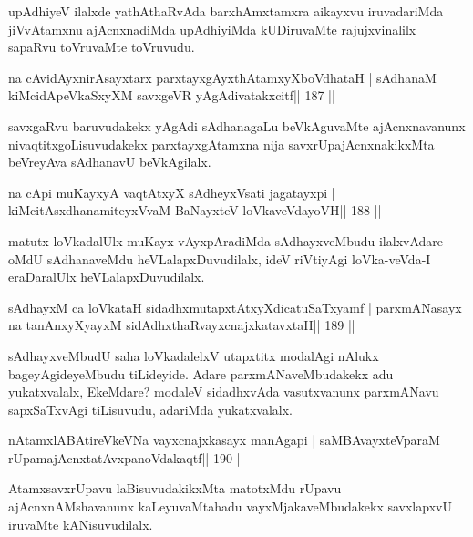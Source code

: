\begin{artha}
upAdhiyeV ilalxde yathAthaRvAda barxhAmxtamxra aikayxvu iruvadariMda jiVvAtamxnu ajAcnxnadiMda upAdhiyiMda kUDiruvaMte rajujxvinalilx sapaRvu toVruvaMte toVruvudu.
\end{artha}

\begin{shl}
na cAvidAyxnirAsayxtarx parxtayxgAyxthAtamxyXboVdhataH |
sAdhanaM kiMcidApeVkaSxyXM savxgeVR yAgAdivatakxcitf\hfill || 187 ||
\end{shl}

\begin{artha}
savxgaRvu baruvudakekx yAgAdi sAdhanagaLu beVkAguvaMte ajAcnxnavanunx nivaqtitxgoLisuvudakekx parxtayxgAtamxna nija savxrUpajAcnxnakikxMta beVreyAva sAdhanavU beVkAgilalx.
\end{artha}

\begin{shl}
na cApi muKayxyA vaqtAtxyX sAdheyxV\s sati jagatayxpi |
kiMcitAsxdhanamiteyxVvaM BaNayxteV loVkaveVdayoVH\hfill || 188 ||
\end{shl}

\begin{artha}
matutx loVkadalUlx muKayx vAyxpAradiMda sAdhayxveMbudu ilalxvAdare oMdU sAdhanaveMdu heVLalapxDuvudilalx, ideV riVtiyAgi loVka-veVda-I eraDaralUlx heVLalapxDuvudilalx.
\end{artha}

\begin{shl}
sAdhayxM ca loVkataH sidadhxmutapxtAtxyXdicatuSaTxyamf |
parxmANasayx na tanAnxyXyayxM sidAdhxthaRvayxcnajxkatavxtaH\hfill || 189 ||
\end{shl}

\begin{artha}
sAdhayxveMbudU saha loVkadalelxV utapxtitx modalAgi nAlukx bageyAgide\-yeMbudu tiLideyide. Adare parxmANaveMbudakekx adu yukatxvalalx, EkeMdare? modaleV sidadhxvAda vasutxvanunx parxmANavu sapxSaTxvAgi tiLisuvudu, adariMda yukatxvalalx.
\end{artha}


\begin{shl}
nA\s\s tamxlABAtireVkeVNa vayxcnajxkasayx manAgapi |
saMBAvayxteV\s paraM rUpamajAcnxtatAvxpanoVdakaqtf\hfill || 190 ||
\end{shl}

\begin{artha}
AtamxsavxrUpavu laBisuvudakikxMta matotxMdu rUpavu ajAcnxnAMshavanunx kaLeyuvaMtahadu vayxMjakaveMbudakekx savxlapxvU iruvaMte kANisuvudilalx.
\end{artha}

